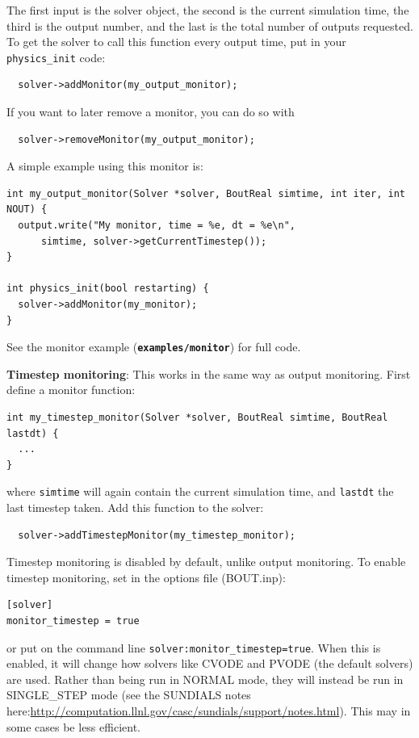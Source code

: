 \documentclass[12pt]{article}
\newcommand{\file}[1]{\texttt{\bf #1}}
\begin{document}
The first input is the solver object, the second is the current simulation time, the third is the output number, and the last is the total number of outputs requested. To get the solver to call this function every output time, put in your \lstinline!physics_init! code:
\begin{lstlisting}
  solver->addMonitor(my_output_monitor);
\end{lstlisting}
If you want to later remove a monitor, you can do so with
\begin{lstlisting}
  solver->removeMonitor(my_output_monitor);
\end{lstlisting}

A simple example using this monitor is:
\begin{lstlisting}
int my_output_monitor(Solver *solver, BoutReal simtime, int iter, int NOUT) {
  output.write("My monitor, time = %e, dt = %e\n", 
      simtime, solver->getCurrentTimestep());
}

int physics_init(bool restarting) {
  solver->addMonitor(my_monitor);
}
\end{lstlisting}

See the monitor example (\file{examples/monitor}) for full code.


{\bf Timestep monitoring}: This works in the same way as output monitoring. First define a monitor function:
\begin{lstlisting}
int my_timestep_monitor(Solver *solver, BoutReal simtime, BoutReal lastdt) {
  ...
}
\end{lstlisting}
where \lstinline!simtime! will again contain the current simulation time, and \lstinline!lastdt! the last
timestep taken. Add this function to the solver:
\begin{lstlisting}
  solver->addTimestepMonitor(my_timestep_monitor);
\end{lstlisting}
Timestep monitoring is disabled by default, unlike output monitoring. To enable timestep monitoring, set in
the options file (BOUT.inp):
\begin{lstlisting}
[solver]
monitor_timestep = true
\end{lstlisting}
or put on the command line \lstinline!solver:monitor_timestep=true!. When this is enabled, it will
change how solvers like CVODE and PVODE (the default solvers) are used. Rather than being run in NORMAL
mode, they will instead be run in SINGLE\_STEP mode (see the SUNDIALS notes here:\url{http://computation.llnl.gov/casc/sundials/support/notes.html}). This may in some cases be less efficient.
\end{document}
